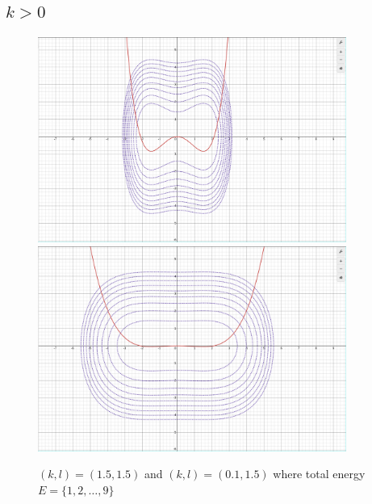 \documentclass[12pt,letter]{article}
\begin{document}
{\subsection*{$k>0$ }
\begin{figure}[H]
	\centering
	\includegraphics[width=0.9\textwidth]{ss/dsms2.png}
	\includegraphics[width=0.9\textwidth]{ss/dsms3.png}
	\caption{$(k,l) = (1.5,1.5)$ and $(k,l) = (0.1,1.5)$ where total energy $E = \{1,2, \ldots, 9\} $}
	\label{fig:ss-dsms3-png}
\end{figure}

}
\end{document}
